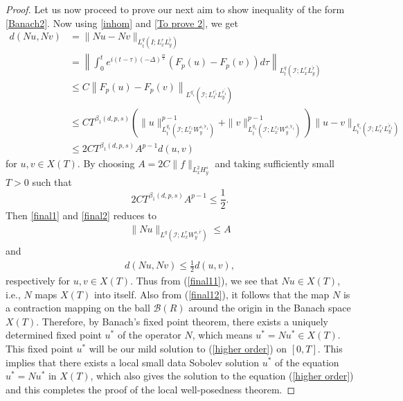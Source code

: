 \documentclass[a4paper,11pt, reqno]{amsart}
\theoremstyle{definition}
\theoremstyle{remark}
\numberwithin{equation}{section}
\begin{document}
\begin{proof}
		Let us now proceed to prove our next aim to show inequality of the form \eqref{Banach2}.  	 Now using  
		\eqref{inhom} and \eqref{To prove 2}, we get 
		\begin{align}\label{final2}\nonumber
			d(Nu, Nv) & =\|Nu-Nv\|_{L_t^q\left(I ; L_x^r L_y^{\tilde{r}}\right)}\\\nonumber
			&=\left\|\int_0^t e^{i(t-\tau)  (-\Delta)^{\frac{m}{2}}} \left( F_p(u)- F_p(v) \right)d \tau\right\|_{L_t^q\left(\mathcal{I} ; L_x^r L_y^{\tilde{r}}\right)} \\\nonumber
			& \leq C\left\|F_p(u)-F_p(v)\right\|_{L^{q_1^{\prime}}\left(\mathcal{I} ; L_x^{r_1^{\prime}} L_y^{\bar{r}_1^{\prime}}\right)}\\\nonumber
			&\leq C T^{\beta_1(d, p, s)}  \left(\|u\|_{L_t^{q_1}\left(\mathcal{I}; L_x^{r_1} W_y^{s, \tilde{r}_1}\right)}^{p-1}+\|v\|_{L_t^{q_1}\left(\mathcal{I} ; L_x^{r_1} W_y^{s, \tilde{r}_1}\right)}^{p-1}\right)\|u-v\|_{L_t^{q_1}\left(\mathcal{I}; L_x^{r_1} L_y^{\tilde{r}_1}\right)}\\ 				
			& \leq 2 C T^{\beta_1(d, p, s)} A^{p-1} d(u, v)
		\end{align} 	for $u, v \in X(T)$.  By choosing $A=2 C\|f\|_{L_x^2 H_y^s}$ and taking  sufficiently small $T>0$  such  that
		$$
		2 C T^{\beta_1(d, p, s)} A^{p-1} \leq \frac{1}{2}.
		$$
		Then \eqref{final1} and \eqref{final2}	 reduces to 	  
		\begin{align}\label{final11}
			\|Nu\|_{L^q\left(\mathcal{I} ; L_x^r W_y^{s, \bar{r}}\right)} \leq A
		\end{align}
		and  	 \begin{align}\label{final12}
			d(Nu, Nv)  \leq \frac{1}{2} d(u, v),
		\end{align}
		respectively 	for $u, v\in X(T).$  Thus from (\ref{final11}), we see that  $Nu \in X(T)$, i.e.,  $N$ maps $X(T)$ into itself. 
		Also from (\ref{final12}),  it follows that the map $N$ is a contraction mapping on the ball $\mathcal{B}(R)$ around the origin in the Banach space $X(T)$. Therefore, by Banach's fixed point theorem,  there exists a uniquely determined fixed point $u^*$ of the operator $N$, which means $u^*=Nu^* \in X(T)$.  This fixed point $u^*$ will be  our mild solution to (\ref{higher order})    on $[0, T]$. This implies that there exists a local   small data Sobolev solution $u^*$ of the equation $ u^*=Nu^* $ in $ X(T)$, which also gives the solution to the   equation (\ref{higher order})  and this completes the proof of the local well-posedness theorem. 
	\end{proof}
	
\end{document}
